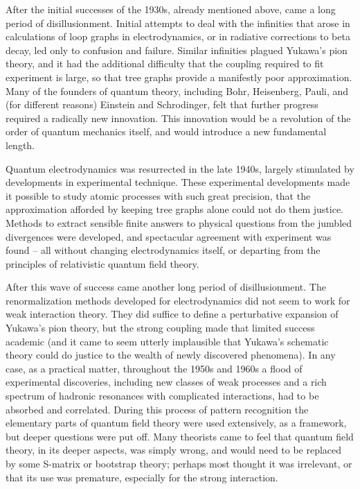 \documentclass[12pt]{article}
\begin{document}
After the initial successes of the 1930s, already mentioned above,
came a long period of disillusionment.  Initial attempts to deal with
the infinities that arose in calculations of loop graphs in
electrodynamics, or in radiative corrections to beta decay, led only
to confusion and failure.  Similar infinities plagued Yukawa's pion
theory, and it had the additional difficulty that the coupling
required to fit experiment is large, so that tree graphs provide a
manifestly poor approximation.  Many of the founders of quantum
theory, including Bohr, Heisenberg, Pauli, and (for different reasons)
Einstein and Schrodinger, felt that further progress required a
radically new innovation.  This innovation would be a revolution of
the order of quantum mechanics itself, and would introduce a new
fundamental length.

Quantum electrodynamics was resurrected in the late 1940s, largely
stimulated by developments in experimental technique.  These
experimental developments made it possible to study atomic processes
with such great precision, that the approximation afforded by keeping
tree graphs alone could not do them justice.  Methods to extract
sensible finite answers to physical questions from the jumbled
divergences were developed, and spectacular agreement with experiment
was found -- all without changing electrodynamics itself, or departing
from the principles of relativistic quantum field theory.  

After this
wave of success came another long period of disillusionment.  The
renormalization methods developed for electrodynamics did not seem to
work for weak interaction theory.  They did suffice to define a
perturbative expansion of Yukawa's pion theory, but the strong
coupling made that limited success academic (and it came to seem
utterly implausible that Yukawa's schematic theory could do justice to
the wealth of newly discovered phenomena).  In any case, as a
practical matter, throughout the 1950s and 1960s a flood of
experimental discoveries, including new classes of weak processes and
a rich spectrum of hadronic resonances with complicated interactions,
had to be absorbed and correlated.  During this process of pattern
recognition the elementary parts of quantum field theory were used
extensively, as a framework, but deeper questions were put off.  Many
theorists came to feel that quantum field theory, in its deeper
aspects, was simply wrong, and would need to be replaced by some
S-matrix or bootstrap theory; perhaps most thought it was irrelevant,
or that its use was premature, especially for the strong interaction.
\end{document}

